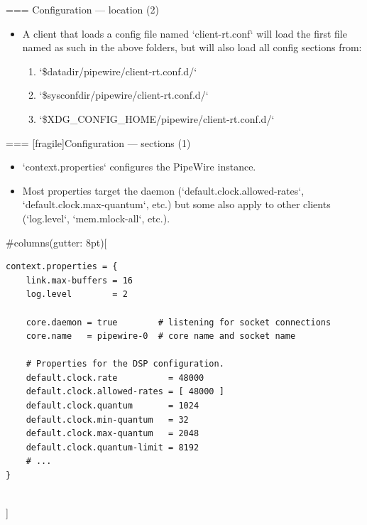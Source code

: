 === {Configuration — location (2)}
  \begin{itemize}

  \item A client that loads a config file named `client-rt.conf`
    will load the first file named as such in the above folders, but
    will also load all config sections from:

    \begin{enumerate}
    \item `\$datadir/pipewire/client-rt.conf.d/`
    \item `\$sysconfdir/pipewire/client-rt.conf.d/`
    \item `\$XDG_CONFIG_HOME/pipewire/client-rt.conf.d/`
    \end{enumerate}

  \end{itemize}




=== [fragile]{Configuration — sections (1)}

  \begin{itemize}
  \item `context.properties` configures the PipeWire instance.

  \item Most properties target the daemon
    (`default.clock.allowed-rates`,
    `default.clock.max-quantum`, etc.) but some also apply to
    other clients (`log.level`, `mem.mlock-all`, etc.).
  \end{itemize}

  
#columns(gutter: 8pt)[
    \begin{block}{}
      \fontsize{8}{8}\selectfont
        \begin{verbatim}
context.properties = {
    link.max-buffers = 16
    log.level        = 2

    core.daemon = true        # listening for socket connections
    core.name   = pipewire-0  # core name and socket name

    # Properties for the DSP configuration.
    default.clock.rate          = 48000
    default.clock.allowed-rates = [ 48000 ]
    default.clock.quantum       = 1024
    default.clock.min-quantum   = 32
    default.clock.max-quantum   = 2048
    default.clock.quantum-limit = 8192
    # ...
}
        \end{verbatim}
      \end{block}
  \\]





